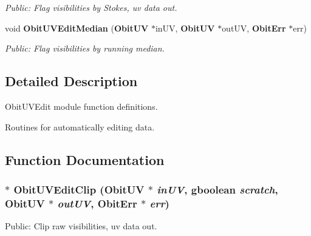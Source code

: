 \begin{CompactItemize}
\begin{CompactList}\small\item\em Public: Flag visibilities by Stokes, uv data out. \item\end{CompactList}\item 
void {\bf Obit\-UVEdit\-Median} ({\bf Obit\-UV} $\ast$in\-UV, {\bf Obit\-UV} $\ast$out\-UV, {\bf Obit\-Err} $\ast$err)
\begin{CompactList}\small\item\em Public: Flag visibilities by running median. \item\end{CompactList}\end{CompactItemize}


\subsection{Detailed Description}
Obit\-UVEdit module function definitions. 

Routines for automatically editing data.

\subsection{Function Documentation}
\subsubsection{$\ast$ Obit\-UVEdit\-Clip ({\bf Obit\-UV} $\ast$ {\em in\-UV}, gboolean {\em scratch}, {\bf Obit\-UV} $\ast$ {\em out\-UV}, {\bf Obit\-Err} $\ast$ {\em err})}\label{ObitUVEdit_8c_a26}


Public: Clip raw visibilities, uv data out. 

